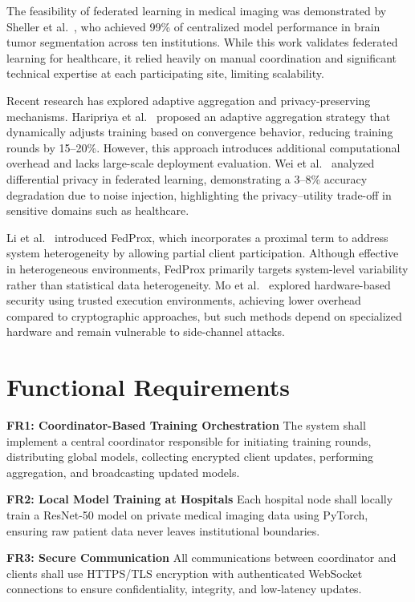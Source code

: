 The feasibility of federated learning in medical imaging was demonstrated by Sheller et al.~\cite{Sheller2020}, who achieved 99\% of centralized model performance in brain tumor segmentation across ten institutions. While this work validates federated learning for healthcare, it relied heavily on manual coordination and significant technical expertise at each participating site, limiting scalability.

Recent research has explored adaptive aggregation and privacy-preserving mechanisms. Haripriya et al.~\cite{Haripriya2025} proposed an adaptive aggregation strategy that dynamically adjusts training based on convergence behavior, reducing training rounds by 15--20\%. However, this approach introduces additional computational overhead and lacks large-scale deployment evaluation. Wei et al.~\cite{Wei2020} analyzed differential privacy in federated learning, demonstrating a 3--8\% accuracy degradation due to noise injection, highlighting the privacy--utility trade-off in sensitive domains such as healthcare.

Li et al.~\cite{Li2018} introduced FedProx, which incorporates a proximal term to address system heterogeneity by allowing partial client participation. Although effective in heterogeneous environments, FedProx primarily targets system-level variability rather than statistical data heterogeneity. Mo et al.~\cite{Mo2021} explored hardware-based security using trusted execution environments, achieving lower overhead compared to cryptographic approaches, but such methods depend on specialized hardware and remain vulnerable to side-channel attacks.


\section{Functional Requirements}

\textbf{FR1: Coordinator-Based Training Orchestration}  
The system shall implement a central coordinator responsible for initiating training rounds, distributing global models, collecting encrypted client updates, performing aggregation, and broadcasting updated models.

\textbf{FR2: Local Model Training at Hospitals}  
Each hospital node shall locally train a ResNet-50 model on private medical imaging data using PyTorch, ensuring raw patient data never leaves institutional boundaries.

\textbf{FR3: Secure Communication}  
All communications between coordinator and clients shall use HTTPS/TLS encryption with authenticated WebSocket connections to ensure confidentiality, integrity, and low-latency updates.

